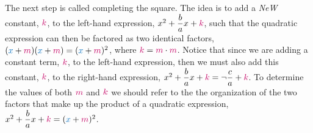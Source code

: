 The next step is called completing the square.  The idea is to add a \textit{NeW} constant, $\color{sthlmRed}k$, to the left-hand expression, $x^2 +\dfrac{b}{a}x+\color{sthlmRed}k$,  such that the quadratic expression can then be factored as two identical factors, $({\color{sthlmBlue}x}+{\color{sthlmRed}m})({\color{sthlmBlue}x}+{\color{sthlmRed}m}) = ({\color{sthlmBlue}x}+{\color{sthlmRed}m})^2$, where  ${{\color{sthlmRed}k}=\color{sthlmRed}m} \cdot {\color{sthlmRed}m}$.  Notice that since we are adding a constant term, $\color{sthlmRed}k$, to the left-hand expression, then we must also add this constant, ${\color{sthlmRed}k}$, to the right-hand expression, $x^2 +\dfrac{b}{a}x+{\color{sthlmRed}k} = \neg \dfrac{c}{a}+{\color{sthlmRed}k}$.  To determine the values of both ${\color{sthlmRed}m}$ and ${\color{sthlmRed}k}$ we should refer to the the organization of the two factors that make up the product of a quadratic expression, $x^2 +\dfrac{b}{a}x+{\color{sthlmRed}k}= ({\color{sthlmBlue}x}+{\color{sthlmRed}m})^2$.\\



